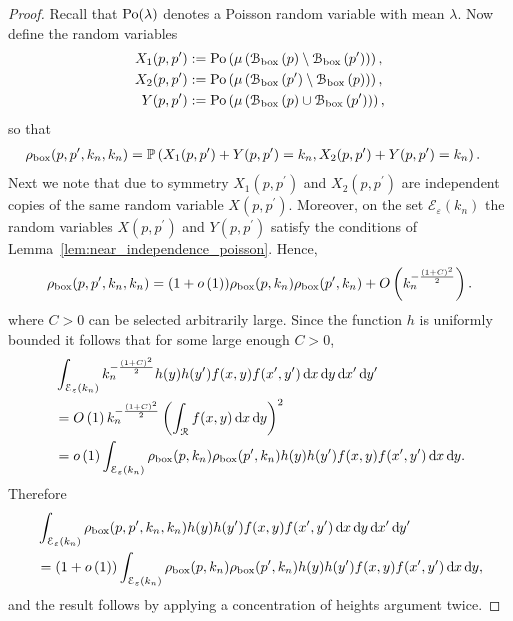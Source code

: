 \begin{proof}
Recall that ${\mathrm{Po}}(\lambda)$ denotes a Poisson random variable with mean $\lambda$. Now define the random variables
\begin{align*}
	X_1(p,p^\prime) &:= {\mathrm{Po}}\left(\mu\left({\mathcal B}_{\text{box}}\left(p\right)\setminus {\mathcal B}_{\text{box}}\left(p^\prime\right)\right)\right),\\
	X_2(p,p^\prime) &:= {\mathrm{Po}}\left(\mu\left({\mathcal B}_{\text{box}}\left(p^\prime\right)\setminus {\mathcal B}_{\text{box}}\left(p\right)\right)\right),\\
	Y(p,p^\prime) &:= {\mathrm{Po}}\left(\mu\left({\mathcal B}_{\text{box}}\left(p\right) \cup {\mathcal B}_{\text{box}}\left(p^\prime\right)\right)\right),
\end{align*}
so that
\begin{align*}
	\rho_{\text{box}}(p,p^\prime,k_n,k_n) &= \mathbb{P}\left(X_1(p,p^\prime) + Y(p,p^\prime) = k_n, X_2(p,p^\prime) + Y(p,p^\prime) = k_n\right).
\end{align*}
Next we note that due to symmetry $X_1(p,p^\prime)$ and $X_2(p,p^\prime)$ are independent copies of the same random variable $X(p,p^\prime)$. Moreover, on the set $\mathcal{E}_\varepsilon(k_n)$ the random variables $X(p,p^\prime)$ and $Y(p,p^\prime)$ satisfy the conditions of Lemma~\ref{lem:near_independence_poisson}. Hence, 
\[
	\rho_{\text{box}}(p,p^\prime,k_n,k_n)
	= (1+o\left(1\right)) \rho_{\text{box}}(p,k_n)\rho_{\text{box}}(p^\prime,k_n) + O\left(k_n^{-\frac{(1+C)^2}{2}}\right).
\]
where $C > 0$ can be selected arbitrarily large. Since the function $h$ is uniformly bounded it follows that for some large enough $C > 0$,
\begin{align*}
	&\int_{\mathcal{E}_\varepsilon(k_n)} k_n^{-\frac{(1+C)^2}{2}} h(y)h(y^\prime) f(x,y) f(x^\prime,y^\prime) \operatorname{\mathrm{d}\hspace{-2pt}} x \operatorname{\mathrm{d}\hspace{-2pt}} y
	\operatorname{\mathrm{d}\hspace{-2pt}} x^\prime \operatorname{\mathrm{d}\hspace{-2pt}} y^\prime \\
	&= O\left(1\right) k_n^{-\frac{(1+C)^2}{2}} \left(\int_{{\mathcal R}} f(x,y) \operatorname{\mathrm{d}\hspace{-2pt}} x \operatorname{\mathrm{d}\hspace{-2pt}} y\right)^2 \\
	&= o\left(1\right) \int_{\mathcal{E}_\varepsilon(k_n)} \rho_{\text{box}}(p,k_n)\rho_{\text{box}}(p^\prime,k_n)
		h(y)h(y^\prime) f(x,y) f(x^\prime,y^\prime) \operatorname{\mathrm{d}\hspace{-2pt}} x \operatorname{\mathrm{d}\hspace{-2pt}} y.
\end{align*}
Therefore
\begin{align*}
	&\int_{\mathcal{E}_\varepsilon(k_n)} \rho_{\text{box}}(p,p^\prime,k_n,k_n) h(y)h(y^\prime) f(x,y) f(x^\prime,y^\prime) 
		\operatorname{\mathrm{d}\hspace{-2pt}} x \operatorname{\mathrm{d}\hspace{-2pt}} y	\operatorname{\mathrm{d}\hspace{-2pt}} x^\prime \operatorname{\mathrm{d}\hspace{-2pt}} y^\prime \\
	&= (1+o\left(1\right)) \int_{\mathcal{E}_\varepsilon(k_n)} \rho_{\text{box}}(p,k_n)\rho_{\text{box}}(p^\prime,k_n)
		h(y)h(y^\prime) f(x,y) f(x^\prime,y^\prime) \operatorname{\mathrm{d}\hspace{-2pt}} x \operatorname{\mathrm{d}\hspace{-2pt}} y,
\end{align*}
and the result follows by applying a concentration of heights argument twice.

\end{proof}
